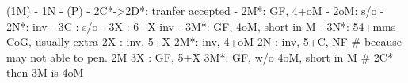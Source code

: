 (1M) - 1N - (P) - 
2C*->2D*: tranfer accepted
        - 2M*: GF, 4+oM
        - 2oM: s/o
        - 2N*: inv
        - 3C : s/o
        - 3X : 6+X inv
        - 3M*: GF, 4oM, short in M
        - 3N*: 54+mms CoG, usually extra
2X : inv, 5+X
2M*: inv, 4+oM
2N : inv, 5+C, NF  # because may not able to pen. 2M
3X : GF, 5+X
3M*: GF, w/o 4oM, short in M  # 2C* then 3M is 4oM